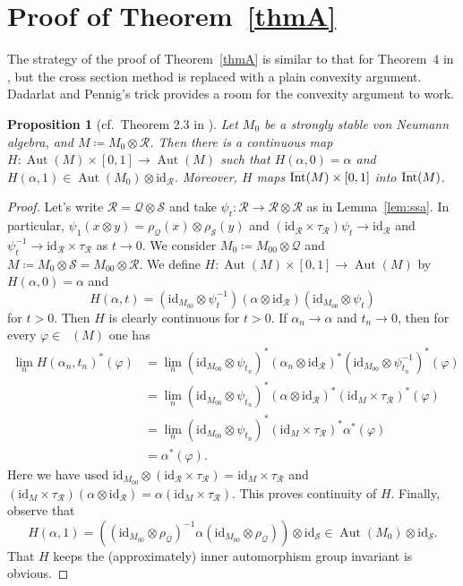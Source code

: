 \documentclass[12pt,nosumlimits,nonamelimits]{amsart}
\newtheorem{prop}[thm]{Proposition}
\theoremstyle{remark}
\newcommand{\cQ}{\mathcal{Q}}
\newcommand{\cR}{\mathcal{R}}
\newcommand{\cS}{\mathcal{S}}
\newcommand{\vp}{\varphi}
\newcommand{\id}{\mathrm{id}}
\DeclareMathOperator{\Aut}{Aut}
\DeclareMathOperator{\Int}{\smash{\overline{\mathrm{Int}}}}
\newcommand{\ns}{\mathop{\mathcal{S}_{\mathrm{n}}}}
\begin{document}
%
\section{Proof of Theorem~\ref{thmA}}
%
The strategy of the proof of Theorem~\ref{thmA} 
is similar to that for Theorem~4 
in \cite{pt}, but the cross section 
method is replaced with a plain convexity argument. 
Dadarlat and Pennig's trick provides a room 
for the convexity argument to work.  

\begin{prop}[cf.\ Theorem 2.3 in \cite{dp}]\label{prop:dp}
Let $M_0$ be a strongly stable von Neumann algebra, 
and $M\coloneqq M_0\otimes\cR$. 
Then there is a continuous map 
$H\colon\Aut(M) \times[0,1] \to \Aut(M)$ 
such that $H(\alpha,0)=\alpha$ and $H(\alpha,1)\in \Aut(M_0)\otimes\id_{\cR}$. 
Moreover, $H$ maps $\Int(M)\times[0,1]$ into $\Int(M)$.
\end{prop}
\begin{proof}
Let's write $\cR=\cQ\otimes\cS$ and 
take $\psi_t\colon\cR\to\cR\otimes\cR$ 
as in Lemma~\ref{lem:ssa}. 
In particular, 
$\psi_1(x\otimes y)=\rho_{\cQ}(x)\otimes\rho_{\cS}(y)$ 
and 
$(\id_{\cR}\times\tau_{\cR})\psi_t\to\id_{\cR}$ 
and $\psi_t^{-1}\to\id_{\cR}\times\tau_{\cR}$ 
as $t\to0$. 
We consider $M_0 \coloneqq M_{00}\otimes\cQ$ and 
$M\coloneqq M_0\otimes\cS=M_{00}\otimes\cR$. 
We define $H\colon \Aut(M)\times[0,1]\to \Aut(M)$ by 
$H(\alpha,0)=\alpha$ and 
\[
H(\alpha,t)=(\id_{M_{00}}\otimes\psi_t^{-1})(\alpha\otimes\id_{\cR})(\id_{M_{00}}\otimes\psi_t)
\] 
for $t>0$. Then $H$ is clearly continuous for $t>0$. 
If $\alpha_n\to\alpha$ and $t_n\to0$, then for every $\vp\in\ns(M)$ 
one has 
\begin{align*}
\lim_n H(\alpha_n,t_n)^*(\vp)
 &= \lim_n (\id_{M_{00}}\otimes\psi_{t_n})^*(\alpha_n\otimes\id_{\cR})^*(\id_{M_{00}}\otimes\psi_{t_n}^{-1})^*(\vp)\\
 &= \lim_n (\id_{M_{00}}\otimes\psi_{t_n})^*(\alpha\otimes\id_{\cR})^*(\id_M\times \tau_{\cR})^*(\vp)\\
 &=\lim_n (\id_{M_{00}}\otimes\psi_{t_n})^*(\id_M\times \tau_{\cR})^*\alpha^*(\vp)\\
 &=\alpha^*(\vp).
\end{align*}
Here we have used 
$\id_{M_{00}}\otimes(\id_{\cR}\times \tau_{\cR})=\id_M\times\tau_{\cR}$ and 
$(\id_M\times\tau_{\cR})(\alpha\otimes\id_{\cR})=\alpha(\id_M\times\tau_{\cR})$. 
This proves continuity of $H$. 
Finally, observe that 
\[
H(\alpha,1)=((\id_{M_{00}}\otimes\rho_{\cQ})^{-1}\alpha(\id_{M_{00}}\otimes\rho_{\cQ})) \otimes\id_{\cS}
\in\Aut(M_0)\otimes\id_{\cS}.
\]
That $H$ keeps the (approximately) inner automorphism 
group invariant is obvious. 
\end{proof}
\end{document}
